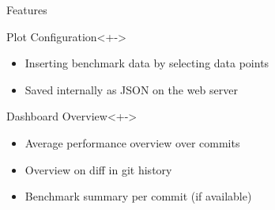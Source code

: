 
\begin{frame}{Features}
  \begin{block}{Plot Configuration}<+->
    \begin{itemize}[<+->]
       \item Inserting benchmark data by selecting data points
       \item Saved internally as JSON on the web server
    \end{itemize}
  \end{block}
  \begin{block}{Dashboard Overview}<+->
    \begin{itemize}[<+->]
       \item Average performance overview over commits
       \item Overview on diff in git history
       \item Benchmark summary per commit (if available)
    \end{itemize}
  \end{block}
\end{frame}